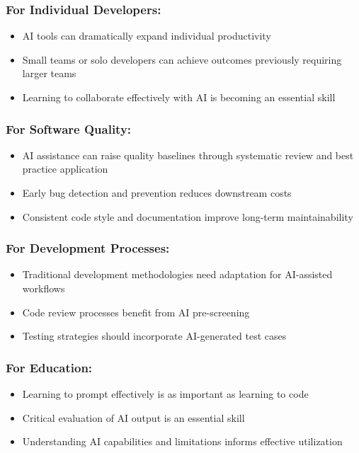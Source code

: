\documentclass[12pt,a4paper]{article}
\begin{document}
\subsubsection*{For Individual Developers:}
\begin{itemize}
    \item AI tools can dramatically expand individual productivity
    \item Small teams or solo developers can achieve outcomes previously requiring larger teams
    \item Learning to collaborate effectively with AI is becoming an essential skill
\end{itemize}

\subsubsection*{For Software Quality:}
\begin{itemize}
    \item AI assistance can raise quality baselines through systematic review and best practice application
    \item Early bug detection and prevention reduces downstream costs
    \item Consistent code style and documentation improve long-term maintainability
\end{itemize}

\subsubsection*{For Development Processes:}
\begin{itemize}
    \item Traditional development methodologies need adaptation for AI-assisted workflows
    \item Code review processes benefit from AI pre-screening
    \item Testing strategies should incorporate AI-generated test cases
\end{itemize}

\subsubsection*{For Education:}
\begin{itemize}
    \item Learning to prompt effectively is as important as learning to code
    \item Critical evaluation of AI output is an essential skill
    \item Understanding AI capabilities and limitations informs effective utilization
\end{itemize}
\end{document}
